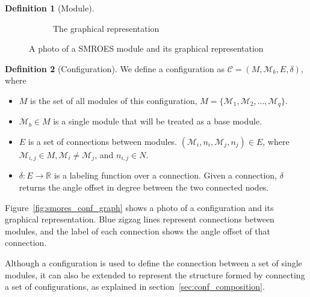\documentclass[conference]{IEEEtran}
\theoremstyle{definition}
\newtheorem{definition}{Definition}[section]
\begin{document}
\begin{definition}[Module]
\begin{figure}
\begin{center}
\begin{subfigure}[b]{0.4\columnwidth}
           	\caption{The graphical representation}
           	\label{fig:smores_graph}
	\end{subfigure}
\end{center}
\caption{A photo of a SMROES module and its graphical representation}
\label{fig:smores}
\end{figure}
\end{definition}

\begin{definition}[Configuration] \label{def:configuration}
We define a configuration as $\mathcal{C}=(M, \mathcal{M}_b, E, \delta)$, where
\begin{itemize}
\item $M$  is the set of all modules of this configuration, $M=\{\mathcal{M}_1, \mathcal{M}_2, ..., \mathcal{M}_q\}$.
\item $\mathcal{M}_b \in M$ is a single module that will be treated as a base module.
\item $E$ is a set of connections between modules. $(\mathcal{M}_i, n_i, \mathcal{M}_j, n_j)\in E$, where $\mathcal{M}_{i,j} \in M, \mathcal{M}_i \neq \mathcal{M}_j$, and $n_{i,j}\in N$.
\item $\delta: E \rightarrow \mathbb{R}$ is a labeling function over a connection. Given a connection, $\delta$ returns the angle offset in degree between the two connected nodes.
\end{itemize}
Figure~\ref{fig:smores_conf_graph} shows a photo of a configuration and its graphical representation. Blue zigzag lines represent connections between modules, and the label of each connection shows the angle offset of that connection.

Although a configuration is used to define the connection between a set of single modules, it can also be extended to represent the structure formed by connecting a set of configurations, as explained in section~\ref{sec:conf_composition}.
\end{definition}
\end{document}
